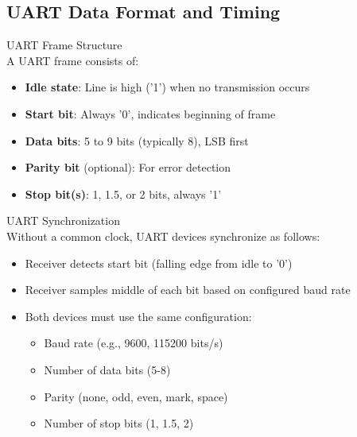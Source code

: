 \multend

\subsection{UART Data Format and Timing}


\begin{definition}{UART Frame Structure}\\
A UART frame consists of:
\begin{itemize}
    \item \textbf{Idle state}: Line is high ('1') when no transmission occurs
    \item \textbf{Start bit}: Always '0', indicates beginning of frame
    \item \textbf{Data bits}: 5 to 9 bits (typically 8), LSB first
    \item \textbf{Parity bit} (optional): For error detection
    \item \textbf{Stop bit(s)}: 1, 1.5, or 2 bits, always '1'
\end{itemize}
\end{definition}

\begin{concept}{UART Synchronization}\\
Without a common clock, UART devices synchronize as follows:
\begin{itemize}
    \item Receiver detects start bit (falling edge from idle to '0')
    \item Receiver samples middle of each bit based on configured baud rate
    \item Both devices must use the same configuration:
    \begin{itemize}
        \item Baud rate (e.g., 9600, 115200 bits/s)
        \item Number of data bits (5-8)
        \item Parity (none, odd, even, mark, space)
        \item Number of stop bits (1, 1.5, 2)
    \end{itemize}
\end{itemize}
\end{concept}

